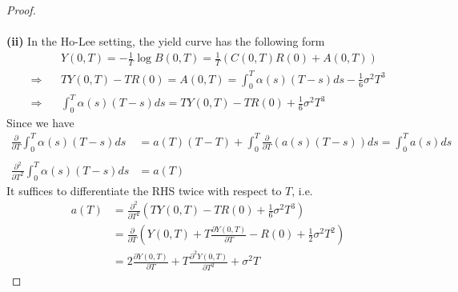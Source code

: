 \documentclass[a4paper, 10pt]{article}
\theoremstyle{definition}
\theoremstyle{hSol}
\begin{document}
\begin{proof}
\begin{equation}
\end{equation}
~\\
\textbf{(ii)} In the Ho-Lee setting, the yield curve has the following form
\begin{equation}
  \begin{split}
    &Y(0,T) = -\frac{1}{T}\log B(0,T) = \frac{1}{T}(C(0,T)R(0) + A(0,T))\\
    \Rightarrow ~~~~&TY(0,T)-TR(0) =  A(0,T) = \int_0^T \alpha(s)(T-s)ds - \frac{1}{6}\sigma^2T^3\\
    \Rightarrow ~~~~&\int_0^T \alpha(s)(T-s)ds = TY(0,T)-TR(0) + \frac{1}{6}\sigma^2T^3
  \end{split}
\end{equation}
Since we have
\begin{equation}
  \begin{split}
    \frac{\partial }{\partial T}\int_0^T \alpha(s)(T-s)ds &= a(T)(T-T)  + \int_0^T \frac{\partial }{\partial T}\left(a(s)(T-s)\right)ds  =  \int_0^T a(s)ds \\
    &\\
    \frac{\partial^2 }{\partial T^2 }\int_0^T \alpha(s)(T-s)ds &= a(T)
  \end{split}
\end{equation}
It suffices to differentiate the RHS twice with respect to $T$, i.e.
\begin{equation}
  \begin{split}
    a(T) &= \frac{\partial^2}{\partial T^2}\left(TY(0,T)-TR(0) + \frac{1}{6}\sigma^2T^3\right) \\
    &=\frac{\partial}{\partial T}\left(Y(0,T) + T \frac{\partial Y(0,T) }{\partial T}   -R(0) + \frac{1}{2}\sigma^2T^2\right)\\
    &= 2\frac{\partial Y(0,T) }{\partial T} + T\frac{\partial^2 Y(0,T) }{\partial T^2} + \sigma^2T
  \end{split}
\end{equation}
\end{proof}
\end{document}
